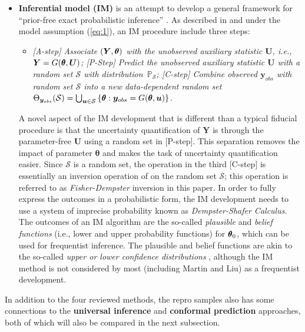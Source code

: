 \documentclass[12pt]{article}
\theoremstyle{shortspace}
\def\*#1{\bm{#1}}
\def\btheta{\mathop{\theta\kern-.45em\hbox{$\theta$}}\nolimits}
\begin{document}
\begin{itemize}
\item[(iv)] {\bf Inferential model (IM)}  is an attempt to develop a general framework for ``prior-free exact  probabilistic inference'' \citep{Martin2015}. As described in \cite{Martin2015} and under the model assumption (\ref{eq:1}), an IM procedure include three steps: 
\begin{itemize}
[leftmargin=1.5em, labelsep=0em, 
align=parleft,   itemsep=0pt,
  parsep=0pt,
  topsep=1pt] 
    \item[] 
{\it {\rm [A-step]} Associate $(\*Y, \btheta)$ with the unobserved auxiliary statistic $\*U$, i.e., $\*Y = G({\btheta}, {\*U})$;
{\rm [P-Step]} Predict the unobserved auxiliary statistic $\*U$ with a random set ${\mathcal S}$ with distribution~${\mathbb P}_{\mathcal S}$;
{\rm [C-step]} Combine observed $\*y_{obs}$ with random set ${\mathcal S}$  into a new data-dependent random set 
$\Theta_{\*y_{obs}}({\mathcal S}) = \bigcup_{\*u \in {\mathcal S}} \left\{\btheta: \*y_{obs} = G(\btheta, \*u)\right\}$.} 
\end{itemize}
A novel aspect of the IM development that is different than a typical fiducial procedure is that the uncertainty quantification of $\*Y$ is through the parameter-free $\*U$ using a random set in [P-step]. This separation removes the impact of parameter $\*\theta$ and makes the task of uncertainty quantification easier. Since ${\mathcal S}$ is a random set, the operation in the third [C-step] is essentially an inversion operation of on the random set ${\mathcal S}$; this operation is referred to as 
{\it Fisher-Dempster}
inversion in this paper. 
In order to fully express the outcomes in a probabilistic form, the IM development needs to use a system of imprecise probability known as {\it Dempster-Shafer Calculus}. 
The outcomes of an IM algorithm are the so-called {\it plausible} and {\it belief functions}  (i.e., lower and upper probability functions) for $\btheta_0$, which can be used for frequentist inference. The plausible and belief functions are akin to the so-called {\it upper or lower confidence distributions} \citep[e.g.,][]{Thornton2022}, although the IM method is not considered by most (including Martin and Liu) as a frequentist development.  
\end{itemize}
In addition to the four reviewed methods, the repro samples also has some connections to the {\bf universal inference} \citep{wasserman2020universal} and {\bf conformal prediction} \citep{shafer2008tutorial} approaches, both of which will also be compared in the next subsection. 
\end{document}
